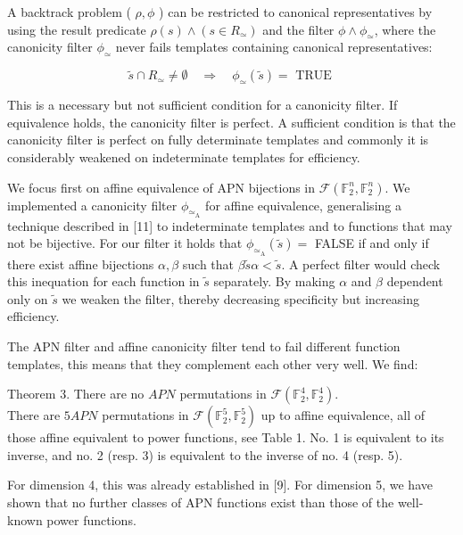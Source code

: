 \documentclass[10pt]{article}
\begin{document}
A backtrack problem ( $\rho, \phi$ ) can be restricted to canonical representatives by using the result predicate $\rho(s) \wedge\left(s \in R_{\simeq}\right)$ and the filter $\phi \wedge \phi_{\simeq}$, where the canonicity filter $\phi_{\simeq}$ never fails templates containing canonical representatives:


\begin{equation*}
\tilde{s} \cap R_{\simeq} \neq \emptyset \quad \Longrightarrow \quad \phi_{\simeq}(\tilde{s})=\text { TRUE } \tag{4}
\end{equation*}


This is a necessary but not sufficient condition for a canonicity filter. If equivalence holds, the canonicity filter is perfect. A sufficient condition is that the canonicity filter is perfect on fully determinate templates and commonly it is considerably weakened on indeterminate templates for efficiency.

We focus first on affine equivalence of APN bijections in $\mathcal{F}\left(\mathbb{F}_{2}^{n}, \mathbb{F}_{2}^{n}\right)$. We implemented a canonicity filter $\phi_{\simeq_{\mathrm{A}}}$ for affine equivalence, generalising a technique described in [11] to indeterminate templates and to functions that may not be bijective. For our filter it holds that $\phi_{\simeq_{\mathrm{A}}}(\tilde{s})=$ FALSE if and only if there exist affine bijections $\alpha, \beta$ such that $\beta \tilde{s} \alpha<\tilde{s}$. A perfect filter would check this inequation for each function in $\tilde{s}$ separately. By making $\alpha$ and $\beta$ dependent only on $\tilde{s}$ we weaken the filter, thereby decreasing specificity but increasing efficiency.

The APN filter and affine canonicity filter tend to fail different function templates, this means that they complement each other very well. We find:

Theorem 3. There are no $A P N$ permutations in $\mathcal{F}\left(\mathbb{F}_{2}^{4}, \mathbb{F}_{2}^{4}\right)$.\\
There are $5 A P N$ permutations in $\mathcal{F}\left(\mathbb{F}_{2}^{5}, \mathbb{F}_{2}^{5}\right)$ up to affine equivalence, all of those affine equivalent to power functions, see Table 1. No. 1 is equivalent to its inverse, and no. 2 (resp. 3) is equivalent to the inverse of no. 4 (resp. 5).

For dimension 4, this was already established in [9]. For dimension 5, we have shown that no further classes of APN functions exist than those of the well-known power functions.
\end{document}
